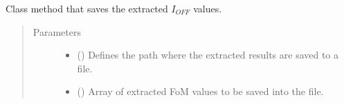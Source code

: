 \documentclass[letterpaper,10pt,english,openany, oneside]{sphinxmanual}
\begin{document}
\begin{fulllineitems}
\begin{fulllineitems}
\label{\detokenize{index:fompy.fom.ioff_ext.save_results_to_file}}
Class method that saves the extracted \(I_{OFF}\) values.
\begin{quote}\begin{description}
\item[{Parameters}] \leavevmode\begin{itemize}
\item {} 
 () \textendash{} Defines the path where the extracted results are saved to a file.

\item {} 
 () \textendash{} Array of extracted FoM values to be saved into the file.

\end{itemize}

\end{description}\end{quote}

\end{fulllineitems}


\end{fulllineitems}

\end{document}
